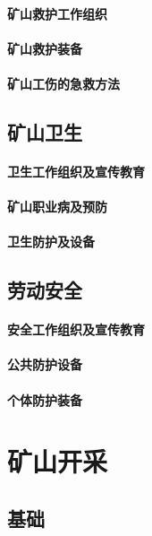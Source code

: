 \documentclass[UTF8]{../../ApplicationUniverse}
\begin{document}
    \subsubsection{矿山救护工作组织}
    \subsubsection{矿山救护装备}
    \subsubsection{矿山工伤的急救方法}
\section{矿山卫生}
    \subsubsection{卫生工作组织及宣传教育}
    \subsubsection{矿山职业病及预防}
    \subsubsection{卫生防护及设备}
\section{劳动安全}
    \subsubsection{安全工作组织及宣传教育}
    \subsubsection{公共防护设备}
    \subsubsection{个体防护装备}











\chapter{矿山开采}
\section{基础}
\end{document}
